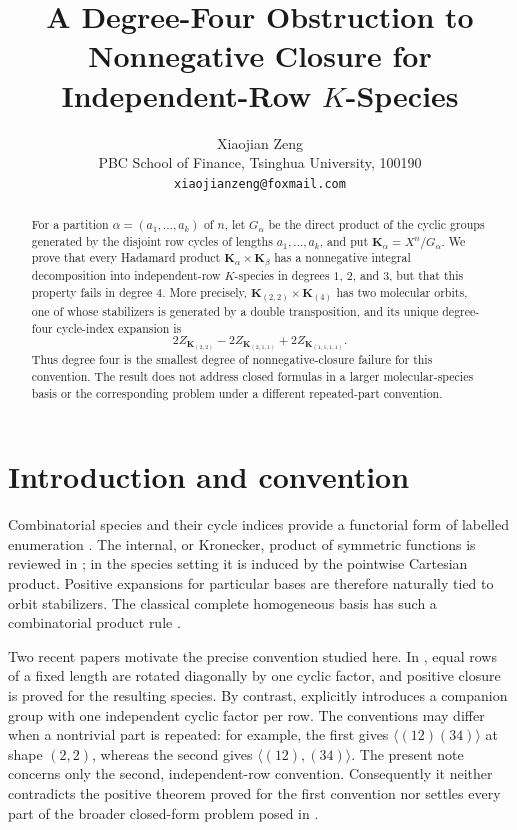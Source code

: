 \documentclass[11pt]{article}
\title{A Degree-Four Obstruction to Nonnegative Closure for Independent-Row $K$-Species}
\author{Xiaojian Zeng\\
PBC School of Finance, Tsinghua University, 100190\\
\texttt{xiaojianzeng@foxmail.com}}
\date{}
\begin{document}
\maketitle

\begin{abstract}
For a partition $\alpha=(a_1,\ldots,a_k)$ of $n$, let $G_\alpha$
be the direct product of the cyclic groups generated by the disjoint row
cycles of lengths $a_1,\ldots,a_k$, and put
$\mathbf{K}_\alpha=X^n/G_\alpha$.  We prove that every Hadamard product
$\mathbf{K}_\alpha\times\mathbf{K}_\beta$ has a nonnegative integral decomposition into
independent-row $K$-species in degrees $1$, $2$, and $3$, but that this
property fails in degree $4$.  More precisely,
$\mathbf{K}_{(2,2)}\times\mathbf{K}_{(4)}$ has two molecular orbits, one of whose
stabilizers is generated by a double transposition, and its unique
degree-four cycle-index expansion is
\[
  2Z_{\mathbf{K}_{(2,2)}}-2Z_{\mathbf{K}_{(2,1,1)}}+2Z_{\mathbf{K}_{(1,1,1,1)}}.
\]
Thus degree four is the smallest degree of nonnegative-closure failure for
this convention.  The result does not address closed formulas in a larger
molecular-species basis or the corresponding problem under a different
repeated-part convention.
\end{abstract}

\section{Introduction and convention}

Combinatorial species and their cycle indices provide a functorial form of
labelled enumeration \cite{Joyal1981,BergeronLabelleLeroux1998}.  The
internal, or Kronecker, product of symmetric functions is reviewed in
\cite[Chapter~I]{Macdonald1995}; in the species setting it is induced by the
pointwise Cartesian product.  Positive expansions for particular bases are
therefore naturally tied to orbit stabilizers.  The classical complete
homogeneous basis has such a combinatorial product rule
\cite{GarsiaRemmel1985}.

Two recent papers motivate the precise convention studied here.  In
\cite[Definition~3.3]{BaolahyBenjamin2026}, equal rows of a fixed length are
rotated diagonally by one cyclic factor, and positive closure is proved for
the resulting species.  By contrast, \cite[Remark~3.2 and Open
Problem~5.1]{BaolahyRandrianirina2026} explicitly introduces a companion
group with one independent cyclic factor per row.  The conventions may
differ when a nontrivial part is repeated: for example, the first gives
$\langle(12)(34)\rangle$ at shape $(2,2)$, whereas the second gives
$\langle(12),(34)\rangle$.  The present note concerns only the second,
independent-row convention.  Consequently it neither contradicts the
positive theorem proved for the first convention nor settles every part of
the broader closed-form problem posed in \cite{BaolahyRandrianirina2026}.
\end{document}
